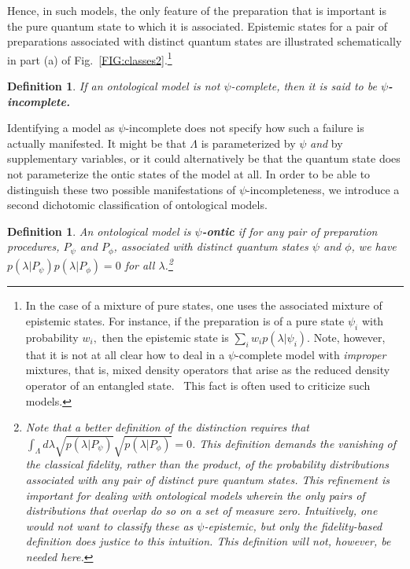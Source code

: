 \documentclass[aps,nofootinbib,12pt]{revtex4}
\newtheorem{definition}[theorem]{Definition}
\begin{document}
Hence, in such models, the only feature of the preparation that is
important is the pure quantum state to which it is associated.
Epistemic states for a pair of preparations associated with distinct
quantum states are illustrated schematically in part (a) of
Fig.~\ref{FIG:classes2}.\footnote{In the case of a mixture of pure
states, one uses the associated mixture of epistemic states. For
instance, if the preparation is of a pure state $\psi_{i}$ with
probability $w_{i},$ then the epistemic state is
$\sum_{i}w_{i}p(\lambda|\psi _{i})$. Note, however, that it is not
at all clear how to deal in a $\psi$-complete model with
\emph{improper} mixtures, that is, mixed density operators that
arise as the reduced density operator of an entangled state. \ This
fact is often used to criticize such models.}

\begin{definition}
\strut If an ontological model is not $\psi$-complete, then it is said to be
\textbf{$\psi$-incomplete. }\label{DEF:psi_incomplete}
\end{definition}

Identifying a model as $\psi $-incomplete does not specify how such
a failure is actually manifested. It might be that $\Lambda$ is
parameterized by $\psi$ \textit{and} by supplementary variables, or
it could alternatively be that the quantum state does not
parameterize the ontic states of the model at all. In order to be
able to distinguish these two possible manifestations of $\psi
$-incompleteness, we introduce a second dichotomic classification of
ontological models.

\begin{definition}
An ontological model is \textbf{$\psi$-ontic} if for any pair of
preparation procedures, $P_{\psi}$ and ${P}_{\phi}$, associated with
distinct quantum states $\psi$ and $\phi$, we have
$p(\lambda|P_{\psi})p(\lambda |P_{\phi})=0$ for all
$\lambda$.\footnote{Note that a better definition of the distinction
requires that $\int_\Lambda d\lambda
\sqrt{p(\lambda|P_{\psi})}\sqrt{p(\lambda |P_{\phi})}=0$. This
definition demands the vanishing of the \textit{classical fidelity},
rather than the product, of the probability distributions associated
with any pair of distinct pure quantum states. This refinement is
important for dealing with ontological models wherein the only pairs
of distributions that overlap do so on a set of measure zero.
Intuitively, one would not want to classify these as
$\psi$-epistemic, but only the fidelity-based definition does
justice to this intuition. This definition will not, however, be
needed here.\label{FNOTE:fidelity}} \label{DEF:psi_ontic}
\end{definition}
\end{document}
